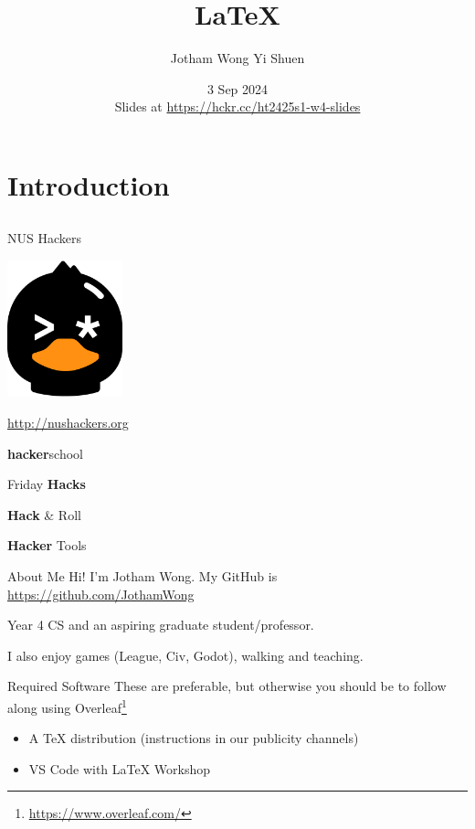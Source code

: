 \documentclass[12pt]{beamer}
\title{\LaTeX{}}
\author{Jotham Wong Yi Shuen}
\date{3 Sep 2024 \\ Slides at \url{https://hckr.cc/ht2425s1-w4-slides}}
\begin{document}
\frame[plain]{\titlepage}

\section{Introduction}
\subsection{}

\begin{frame}{NUS Hackers}

  \begin{center}
    \includegraphics[width=0.25\textwidth]{./res/logo_head_light.png}
    
    \url{http://nushackers.org}
  \end{center}

  \begin{center}
    \textbf{hacker}school

    Friday \textbf{Hacks}

    \textbf{Hack} \& Roll

    \textbf{Hacker} Tools
  \end{center}

\end{frame}

\begin{frame}{About Me}
  Hi! I'm Jotham Wong. My GitHub is \url{https://github.com/JothamWong}

  Year 4 CS and an aspiring graduate student/professor.

  I also enjoy games (League, Civ, Godot), walking and teaching.

\end{frame}

\begin{frame}{Required Software}
  These are preferable, but otherwise you should be to follow along using Overleaf\footnote{\url{https://www.overleaf.com/}}
  \begin{itemize}
    \item A \TeX{} distribution (instructions in our publicity channels)
    \item VS Code with LaTeX Workshop
  \end{itemize}
\end{frame}
\end{document}

